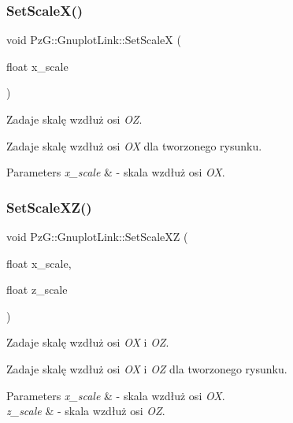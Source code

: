 \subsubsection{\texorpdfstring{Set\+Scale\+X()}{SetScaleX()}}
{\footnotesize\ttfamily void Pz\+G\+::\+Gnuplot\+Link\+::\+Set\+ScaleX (\begin{DoxyParamCaption}\item[{float}]{x\+\_\+scale }\end{DoxyParamCaption})\hspace{0.3cm}{\ttfamily [inline]}}



Zadaje skalę wzdłuż osi {\itshape OZ}. 

Zadaje skalę wzdłuż osi {\itshape OX} dla tworzonego rysunku. 
\begin{DoxyParams}{Parameters}
{\em x\+\_\+scale} & -\/ skala wzdłuż osi {\itshape OX}. \\
\hline
\end{DoxyParams}
\mbox{\label{class_pz_g_1_1_gnuplot_link_a922cef9903317477051890311f6f4dec}} 
\subsubsection{\texorpdfstring{Set\+Scale\+X\+Z()}{SetScaleXZ()}}
{\footnotesize\ttfamily void Pz\+G\+::\+Gnuplot\+Link\+::\+Set\+Scale\+XZ (\begin{DoxyParamCaption}\item[{float}]{x\+\_\+scale,  }\item[{float}]{z\+\_\+scale }\end{DoxyParamCaption})\hspace{0.3cm}{\ttfamily [inline]}}



Zadaje skalę wzdłuż osi {\itshape OX} i {\itshape OZ}. 

Zadaje skalę wzdłuż osi {\itshape OX} i {\itshape OZ} dla tworzonego rysunku. 
\begin{DoxyParams}{Parameters}
{\em x\+\_\+scale} & -\/ skala wzdłuż osi {\itshape OX}. \\
\hline
{\em z\+\_\+scale} & -\/ skala wzdłuż osi {\itshape OZ}. \\
\hline
\end{DoxyParams}
\mbox{\label{class_pz_g_1_1_gnuplot_link_adb266ff0cb6bc916dcb12b6bd168ba14}} 
